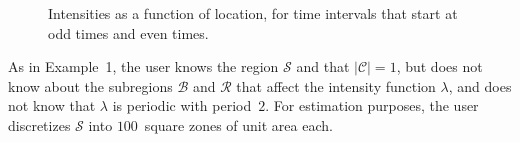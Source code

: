 \documentclass[article]{jss}
\begin{document}
\begin{figure}
\centering
\resizebox{\textwidth}{!}{
\begin{tabular}{cc}
\texttt{[image: lambdanceven.pdf]}&
\texttt{[image: lambdancodd.pdf]}\\
$\hspace*{0.6cm}$  (c) Time intervals that start at odd times& $\hspace*{0.6cm}$(d) Time intervals that start at even times
\end{tabular}}
\caption{\label{figuresex2}
Intensities as a function of location, for time intervals that start at odd times and even times.}
\end{figure}

As in Example~1, the user knows the region $\mathcal{S}$ and that $|\mathcal{C}| = 1$, but does not know about the subregions $\mathcal{B}$ and $\mathcal{R}$ that affect the intensity function $\lambda$, and does not know that $\lambda$ is periodic with period~$2$.
For estimation purposes, the user discretizes $\mathcal{S}$ into $100$~square zones of unit area each.
\end{document}

